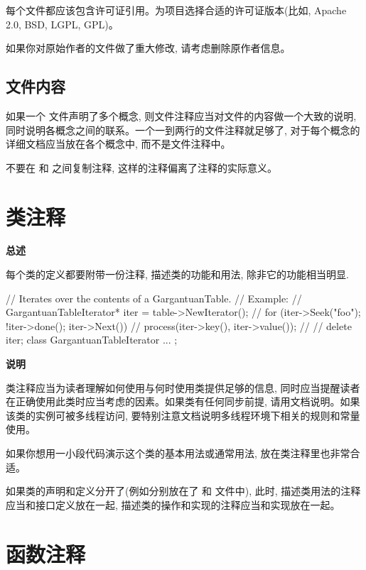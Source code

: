每个文件都应该包含许可证引用。为项目选择合适的许可证版本(比如, Apache 2.0, BSD, LGPL, GPL)。

如果你对原始作者的文件做了重大修改, 请考虑删除原作者信息。

\subsection{文件内容}

如果一个  文件声明了多个概念, 则文件注释应当对文件的内容做一个大致的说明, 同时说明各概念之间的联系。一个一到两行的文件注释就足够了, 对于每个概念的详细文档应当放在各个概念中, 而不是文件注释中。

不要在  和  之间复制注释, 这样的注释偏离了注释的实际意义。

\label{class-comments}

\section{类注释}

\textbf{总述}

每个类的定义都要附带一份注释, 描述类的功能和用法, 除非它的功能相当明显.

\begin{cppcode}
// Iterates over the contents of a GargantuanTable.
// Example:
//    GargantuanTableIterator* iter = table->NewIterator();
//    for (iter->Seek("foo"); !iter->done(); iter->Next()) {
//      process(iter->key(), iter->value());
//    }
//    delete iter;
class GargantuanTableIterator {
  ...
};
\end{cppcode}

\textbf{说明}

类注释应当为读者理解如何使用与何时使用类提供足够的信息, 同时应当提醒读者在正确使用此类时应当考虑的因素。如果类有任何同步前提, 请用文档说明。如果该类的实例可被多线程访问, 要特别注意文档说明多线程环境下相关的规则和常量使用。

如果你想用一小段代码演示这个类的基本用法或通常用法, 放在类注释里也非常合适。

如果类的声明和定义分开了(例如分别放在了  和  文件中), 此时, 描述类用法的注释应当和接口定义放在一起, 描述类的操作和实现的注释应当和实现放在一起。

\section{函数注释}

